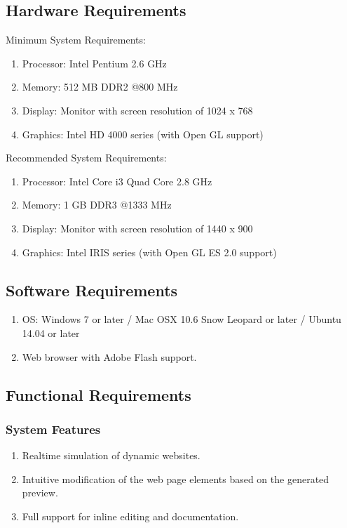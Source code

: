 \documentclass[12pt,a4paper]{article}
\begin{document}
\subsection{Hardware Requirements}
Minimum System Requirements:
\begin{enumerate}
\item Processor: Intel Pentium 2.6 GHz 
\item Memory: 512 MB DDR2 @800 MHz
\item Display: Monitor with screen resolution of 1024 x 768
\item Graphics: Intel HD 4000 series (with Open GL support)
\end{enumerate}
Recommended System Requirements:
\begin{enumerate}
\item Processor: Intel Core i3 Quad Core 2.8 GHz 
\item Memory: 1 GB DDR3 @1333 MHz
\item Display: Monitor with screen resolution of 1440 x 900
\item Graphics: Intel IRIS series (with Open GL ES 2.0 support)
\end{enumerate}

\subsection{Software Requirements}
\begin{enumerate}
\item OS: Windows 7 or later / Mac OSX 10.6 Snow Leopard or later / Ubuntu 14.04 or later
\item Web browser with Adobe Flash support.\cite{adobe} 
\end{enumerate}

\subsection{Functional Requirements}
\subsubsection{System Features}
\begin{enumerate}
\item Realtime simulation of dynamic websites.
\item Intuitive modification of the web page elements based on the generated preview.
\item Full support for inline editing and documentation.
\end{enumerate}
\end{document}
